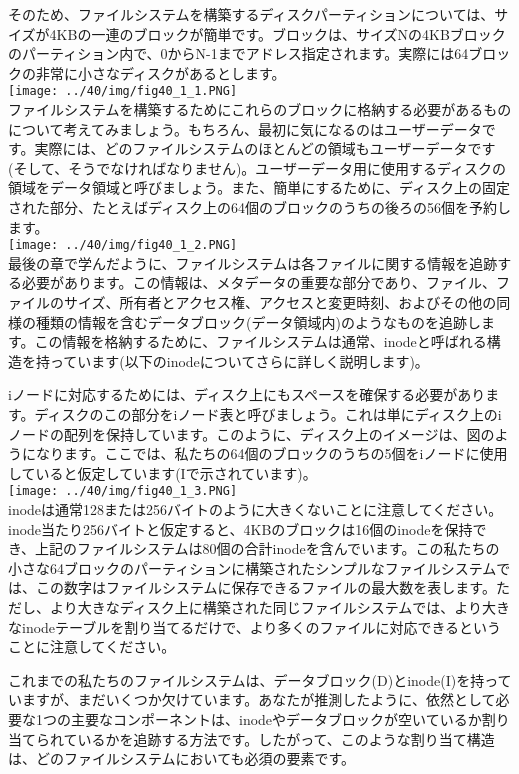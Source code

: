 そのため、ファイルシステムを構築するディスクパーティションについては、サイズが4KBの一連のブロックが簡単です。ブロックは、サイズNの4KBブロックのパーティション内で、0からN-1までアドレス指定されます。実際には64ブロックの非常に小さなディスクがあるとします。\\
\texttt{[image: ../40/img/fig40\_1\_1.PNG]}\\
ファイルシステムを構築するためにこれらのブロックに格納する必要があるものについて考えてみましょう。もちろん、最初に気になるのはユーザーデータです。実際には、どのファイルシステムのほとんどの領域もユーザーデータです(そして、そうでなければなりません)。ユーザーデータ用に使用するディスクの領域をデータ領域と呼びましょう。また、簡単にするために、ディスク上の固定された部分、たとえばディスク上の64個のブロックのうちの後ろの56個を予約します。\\
\texttt{[image: ../40/img/fig40\_1\_2.PNG]}\\
最後の章で学んだように、ファイルシステムは各ファイルに関する情報を追跡する必要があります。この情報は、メタデータの重要な部分であり、ファイル、ファイルのサイズ、所有者とアクセス権、アクセスと変更時刻、およびその他の同様の種類の情報を含むデータブロック(データ領域内)のようなものを追跡します。この情報を格納するために、ファイルシステムは通常、inodeと呼ばれる構造を持っています(以下のinodeについてさらに詳しく説明します)。

iノードに対応するためには、ディスク上にもスペースを確保する必要があります。ディスクのこの部分をiノード表と呼びましょう。これは単にディスク上のiノードの配列を保持しています。このように、ディスク上のイメージは、図のようになります。ここでは、私たちの64個のブロックのうちの5個をiノードに使用していると仮定しています(Iで示されています)。\\
\texttt{[image: ../40/img/fig40\_1\_3.PNG]}\\
inodeは通常128または256バイトのように大きくないことに注意してください。inode当たり256バイトと仮定すると、4KBのブロックは16個のinodeを保持でき、上記のファイルシステムは80個の合計inodeを含んでいます。この私たちの小さな64ブロックのパーティションに構築されたシンプルなファイルシステムでは、この数字はファイルシステムに保存できるファイルの最大数を表します。ただし、より大きなディスク上に構築された同じファイルシステムでは、より大きなinodeテーブルを割り当てるだけで、より多くのファイルに対応できるということに注意してください。

これまでの私たちのファイルシステムは、データブロック(D)とinode(I)を持っていますが、まだいくつか欠けています。あなたが推測したように、依然として必要な1つの主要なコンポーネントは、inodeやデータブロックが空いているか割り当てられているかを追跡する方法です。したがって、このような割り当て構造は、どのファイルシステムにおいても必須の要素です。


